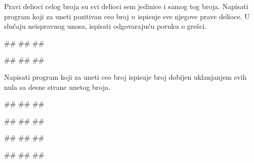 \begin{Exercise}[label=PET_08] 
Pravi delioci celog broja su svi delioci sem jedinice i samog tog
broja. Napisati program koji za uneti pozitivan ceo broj $n$
ispisuje sve njegove prave delioce.
U slučaju neispravnog unosa, ispisati odgovarajuću poruku o grešci.


\begin{miditest}
\begin{upotreba}{1}
#\naslovInt#
##
##
\end{upotreba}
\end{miditest}
\begin{miditest}
\begin{upotreba}{2}
#\naslovInt#
##
##
\end{upotreba}
\end{miditest}
\end{Exercise}
\ifresenja
\begin{Answer}[ref=PET_08]
\end{Answer}
\fi


\begin{Exercise}[label=PET_09] 
Napisati program koji za uneti ceo broj ispisuje broj dobijen
uklanjanjem svih nula sa desne strane unetog broja.
 

\begin{miditest}
\begin{upotreba}{1}
#\naslovInt#
##
##
\end{upotreba}
\end{miditest}
\begin{miditest}
\begin{upotreba}{2}
#\naslovInt#
##
##
\end{upotreba}
\end{miditest}

\begin{miditest}
\begin{upotreba}{3}
#\naslovInt#
##
##
\end{upotreba}
\end{miditest}
\begin{miditest}
\begin{upotreba}{4}
#\naslovInt#
##
##
\end{upotreba}
\end{miditest}

\end{Exercise}
\ifresenja
\begin{Answer}[ref=PET_09]
\end{Answer}
\fi


